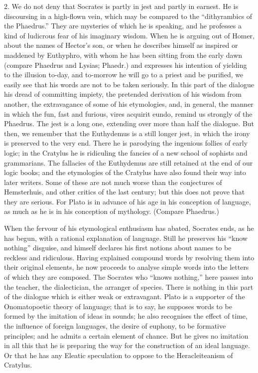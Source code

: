 \documentclass[11pt,letter]{article}
\begin{document}
\par  2. We do not deny that Socrates is partly in jest and partly in earnest. He is discoursing in a high-flown vein, which may be compared to the “dithyrambics of the Phaedrus.” They are mysteries of which he is speaking, and he professes a kind of ludicrous fear of his imaginary wisdom. When he is arguing out of Homer, about the names of Hector’s son, or when he describes himself as inspired or maddened by Euthyphro, with whom he has been sitting from the early dawn (compare Phaedrus and Lysias; Phaedr.) and expresses his intention of yielding to the illusion to-day, and to-morrow he will go to a priest and be purified, we easily see that his words are not to be taken seriously. In this part of the dialogue his dread of committing impiety, the pretended derivation of his wisdom from another, the extravagance of some of his etymologies, and, in general, the manner in which the fun, fast and furious, vires acquirit eundo, remind us strongly of the Phaedrus. The jest is a long one, extending over more than half the dialogue. But then, we remember that the Euthydemus is a still longer jest, in which the irony is preserved to the very end. There he is parodying the ingenious follies of early logic; in the Cratylus he is ridiculing the fancies of a new school of sophists and grammarians. The fallacies of the Euthydemus are still retained at the end of our logic books; and the etymologies of the Cratylus have also found their way into later writers. Some of these are not much worse than the conjectures of Hemsterhuis, and other critics of the last century; but this does not prove that they are serious. For Plato is in advance of his age in his conception of language, as much as he is in his conception of mythology. (Compare Phaedrus.)

\par  When the fervour of his etymological enthusiasm has abated, Socrates ends, as he has begun, with a rational explanation of language. Still he preserves his “know nothing” disguise, and himself declares his first notions about names to be reckless and ridiculous. Having explained compound words by resolving them into their original elements, he now proceeds to analyse simple words into the letters of which they are composed. The Socrates who “knows nothing,” here passes into the teacher, the dialectician, the arranger of species. There is nothing in this part of the dialogue which is either weak or extravagant. Plato is a supporter of the Onomatopoetic theory of language; that is to say, he supposes words to be formed by the imitation of ideas in sounds; he also recognises the effect of time, the influence of foreign languages, the desire of euphony, to be formative principles; and he admits a certain element of chance. But he gives no imitation in all this that he is preparing the way for the construction of an ideal language. Or that he has any Eleatic speculation to oppose to the Heracleiteanism of Cratylus.
\end{document}
